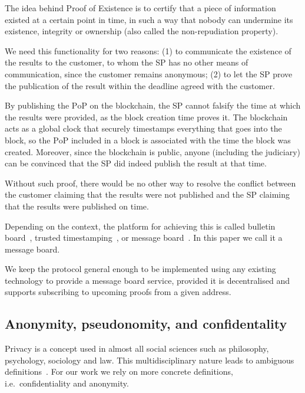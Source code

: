 \documentclass[pdftex,twocolumn,epjc3]{svjour3}
\begin{document}
{The idea behind Proof of Existence is to certify that a piece of information existed at a certain point in time, in such a way that nobody can undermine its existence, integrity or ownership (also called the non-repudiation property).


We need this functionality for two reasons: (1) to communicate the existence of the results to the customer, to whom the SP has no other means of communication, since the customer remains anonymous; (2) to let the SP prove the publication of the result within the deadline agreed with the customer. 

By publishing the $\mathrm{PoP}$ on the blockchain, the SP cannot falsify the time at which the results were provided, as the block creation time proves it. The blockchain acts as a global clock that securely timestamps everything that goes into the block, so the $\mathrm{PoP}$ included in a block is associated with the time the block was created. Moreover, since the blockchain is public, anyone (including the judiciary) can be convinced that the SP did indeed publish the result at that time.

Without such proof, there would be no other way to resolve the conflict between the customer claiming that the results were not published and the SP claiming that the results were published on time.

Depending on the context, the platform for achieving this is called bulletin board~\cite{achenbachImprovedCoercionresistantElectronic2015}, trusted timestamping~\cite{gippDecentralizedTrustedTimestamping2015}, or message board~\cite{hinarejosSolutionSecureCertified2019}. In this paper we call it a message board.

We keep the protocol general enough to be implemented using any existing technology to provide a message board service, provided it is decentralised and supports subscribing to upcoming proofs from a given address.

\subsection{Anonymity, pseudonomity, and confidentality}\label{sec:pseudo-anon}

Privacy is a concept used in almost all social sciences such as philosophy, psychology, sociology and law. This multidisciplinary nature leads to ambiguous definitions~\cite{smithInformationPrivacyResearch2011}. For our work we rely on more concrete definitions, i.e.~confidentiality and anonymity.

}
\end{document}
